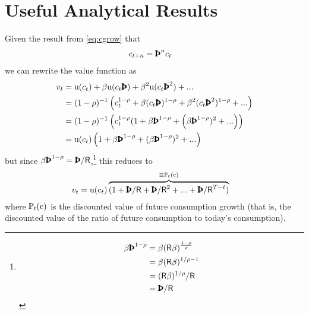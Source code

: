 \documentclass{scrartcl}
\begin{document}
\hypertarget{Useful-Analytical-Results}{}
\section{Useful Analytical Results}

Given the result from  \eqref{eq:cgrow} that
\begin{equation}\begin{gathered}\begin{aligned}
  c_{t+n} & =  \APFac^{n} c_{t} \notag
\end{aligned}\end{gathered}\end{equation}
we can rewrite the value function as
\begin{equation}\begin{gathered}\begin{aligned}
  v_{t} & =  \uFunc(c_{t}) + \DiscFac \uFunc(c_{t}\APFac) + \DiscFac^{2} \uFunc(c_{t} \APFac^{2}) + ...
  \\ & =  (1-\CRRA)^{-1}\left(c_{t}^{1-\CRRA} + \DiscFac (c_{t}\APFac)^{1-\CRRA} + \DiscFac^{2} (c_{t} \APFac^{2})^{1-\CRRA} + ...\right)\notag 
  \\ & =  (1-\CRRA)^{-1}\left(c_{t}^{1-\CRRA}(1+\DiscFac \APFac^{1-\CRRA} + \left(\DiscFac \APFac^{1-\CRRA})^{2} + ... \right) \right)\notag 
\\ & =  \uFunc(c_{t})\left(1+\DiscFac \APFac^{1-\CRRA} + (\DiscFac \APFac^{1-\CRRA})^{2} + ... \right)\notag 
\end{aligned}\end{gathered}\end{equation}
but since $\DiscFac \APFac^{1-\CRRA} = \RPFac$,\footnote{
\begin{equation}\begin{gathered}\begin{aligned}
  \DiscFac \APFac^{1-\CRRA} & =  \DiscFac (\Rfree \DiscFac)^{\frac{1-\CRRA}{\CRRA}}
  \\ & =                               \DiscFac (\Rfree \DiscFac)^{1/\CRRA-1}
  \\ & =             (\Rfree \DiscFac)^{1/\CRRA} / \Rfree
           \\ & =  \RPFac
\end{aligned}\end{gathered}\end{equation}}
this reduces to  \hypertarget{vFuncAnalytical}{}
\begin{equation}\begin{gathered}\begin{aligned}
  v_{t} &=  \uFunc(c_{t})\overbrace{(1+\RPFac+\RPFac^{2}+...+\RPFac^{T-t})}^{\equiv \PDV_{t}(\cFunc)} \label{eq:vFuncAnalytical}
\end{aligned}\end{gathered}\end{equation}
where ${\mathbb{P}}_{t}(\mathrm{c})$ is the discounted value of future consumption growth (that is, the discounted value of the ratio of future consumption to today's consumption).
\end{document}
